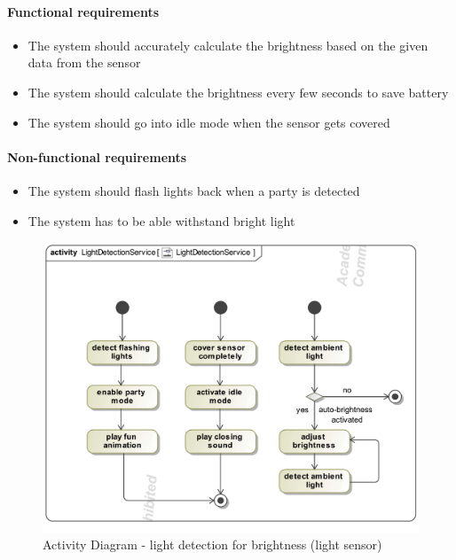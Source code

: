 \documentclass{article}
\begin{document}
		\paragraph{Functional requirements}
		\begin{itemize}
			\item The system should accurately calculate the brightness based on the given data from the sensor
			\item The system should calculate the brightness every few seconds to save battery
			\item The system should go into idle mode when the sensor gets covered
		\end{itemize}
		
		\paragraph{Non-functional requirements}
		\begin{itemize}
			\item The system should flash lights back when a party is detected
			\item The system has to be able withstand bright light
		\end{itemize}
		\clearpage
		\begin{figure}[h!]
		    	\centering
		   	\captionsetup{labelformat=empty}
		   	\caption{Activity Diagram - light detection for brightness (light sensor)}
		    	\includegraphics[width=\textwidth, angle=0]{Marc/light/LightDetectionServiceActivity.pdf}
		\end{figure}
		\clearpage
\end{document}

